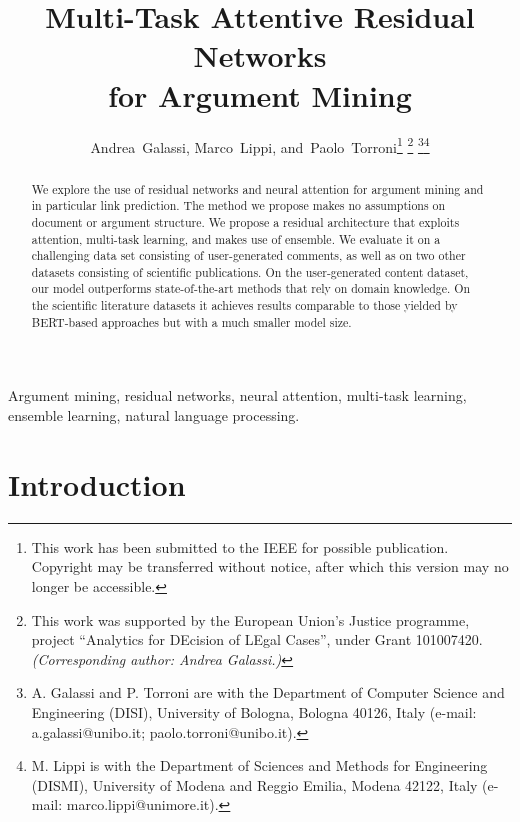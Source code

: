\documentclass[journal]{IEEEtran}
\begin{document}
\title{Multi-Task Attentive Residual Networks\\for Argument Mining}

\author{Andrea~Galassi,
        Marco~Lippi,
        and~Paolo~Torroni\thanks{This work has been submitted to the IEEE for possible publication. Copyright may be transferred without notice, after which this version may no longer be accessible.}
\thanks{This work was supported by the European Union’s Justice programme, project ``Analytics for DEcision of LEgal Cases'', under Grant 101007420. \emph{(Corresponding author: Andrea Galassi.)}}
\thanks{A. Galassi and P. Torroni are with the Department of Computer Science and Engineering (DISI), University of Bologna, Bologna 40126, Italy (e-mail: a.galassi@unibo.it; paolo.torroni@unibo.it).}\thanks{M. Lippi is with the Department of Sciences and Methods for Engineering (DISMI), University of Modena and Reggio Emilia, Modena 42122, Italy (e-mail: marco.lippi@unimore.it).}}


\maketitle

\begin{abstract}
We explore the use of residual networks and neural attention for argument mining and in particular link prediction. The method we propose makes no assumptions on document or argument structure. We propose a residual architecture that exploits attention, multi-task learning, and makes use of ensemble.
We evaluate it on a challenging data set consisting of user-generated comments, as well as on two other datasets consisting of scientific publications. On the user-generated content dataset, our model outperforms state-of-the-art methods that rely on domain knowledge. On the scientific literature datasets it achieves results comparable to those yielded by BERT-based approaches but with a much smaller model size.
\end{abstract}

\begin{IEEEkeywords}
Argument mining, residual networks, neural attention, multi-task learning, ensemble learning, natural language processing.
\end{IEEEkeywords}






\IEEEpeerreviewmaketitle

\section{Introduction}
\label{sec:intro}
\end{document}

